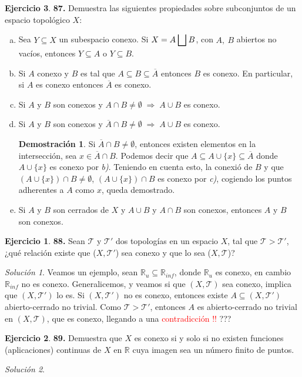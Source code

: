 \documentclass[12pt,twoside]{report}
\newcommand\mc[1]{\mathcal{#1}}
\theoremstyle{azul}
\theoremstyle{azul2}
\theoremstyle{plain}
\theoremstyle{definition}
\newtheorem*{dem}{Demostración}
\newtheorem*{ejern}{Ejercicio}
\theoremstyle{remark}
\newtheorem*{sol}{Solución}
\begin{document}
\begin{ejern} \textbf{87.} Demuestra las siguientes propiedades sobre subconjuntos de un espacio topológico $X$:
\begin{enumerate}[a)]
    \item Sea $Y \subseteq X$ un subespacio conexo. Si $X = A \: \mathlarger{\bigsqcup} \: B$, con $A, \: B$ abiertos no vacíos, entonces $Y \subseteq A$ o $Y \subseteq B$.
    \item Si $A$ conexo y $B$ es tal que $A \subseteq B \subseteq \overline{A}$ entonces $B$ es conexo. En particular, si $A$ es conexo entonces $\overline{A}$ es conexo.
    \item Si $A$ y $B$ son conexos y $A \cap B \neq \emptyset \; \Rightarrow \;  A \cup B$ es conexo.
    \item Si $A$ y $B$ son conexos y $\overline{A} \cap B \neq \emptyset \; \Rightarrow \;  A \cup B$ es conexo.
    \vspace{-3mm} \begin{dem}
    Si $\overline{A} \cap B \neq \emptyset$, entonces existen elementos en la intersección, sea $x \in \overline{A} \cap B$. Podemos decir que $A \subseteq A \cup \{x\} \subseteq \overline{A}$ donde $A \cup \{x\}$ es conexo por \textit{b)}. Teniendo en cuenta esto, la conexió de $B$ y que $(A \cup \{x\})\cap B \neq \emptyset$, $(A \cup \{x\})\cap B$ es conexo por \textit{c)}, cogiendo los puntos adherentes a $A$ como $x$, queda demostrado. 
    \end{dem}
    \item Si $A$ y $B$ son cerrados de $X$ y $A \cup B$ y $A \cap B$ son conexos, entonces $A$ y $B$ son conexos.
\end{enumerate}
\; \vspace{-5mm}
\begin{ejern} \textbf{88.} 
Sean $\mc{T}$ y $\mc{T}'$ dos topologías en un espacio $X$, tal que $\mc{T} > \mc{T}'$, ¿qu{\'e} relación existe que ($X, \mc{T}'$) sea conexo y que lo sea ($X, \mc{T}$)?
\end{ejern}
\begin{sol}
Veamos un ejemplo, sean $\mathbb{R}_{u} \subseteq \mathbb{R}_{inf}$, donde $\mathbb{R}_u$ es conexo, en cambio $\mathbb{R}_{inf}$ no es conexo. Generalicemos, y veamos si que $(X, \mc{T})$ sea conexo, implica que $(X, \mc{T}')$ lo es. Si $(X, \mc{T}')$ no es conexo, entonces existe $A \subseteq (X, \mc{T}')$ abierto-cerrado no trivial. Como $\mc{T} > \mc{T}'$, entonces $A$ es abierto-cerrado no trivial en $(X, \mc{T})$, que es conexo, llegando a una \textcolor{red}{contradicción !!} ???
\end{sol}
\; \vspace{-5mm}
\begin{ejern} \textbf{89.}
Demuestra que $X$ es conexo si y solo si no existen funciones (aplicaciones) continuas de $X$ en $\mathbb{R}$ cuya imagen sea un n{\'u}mero finito de puntos. 
\end{ejern}
\begin{sol} \;


\end{sol}
\end{ejern}
\end{document}
